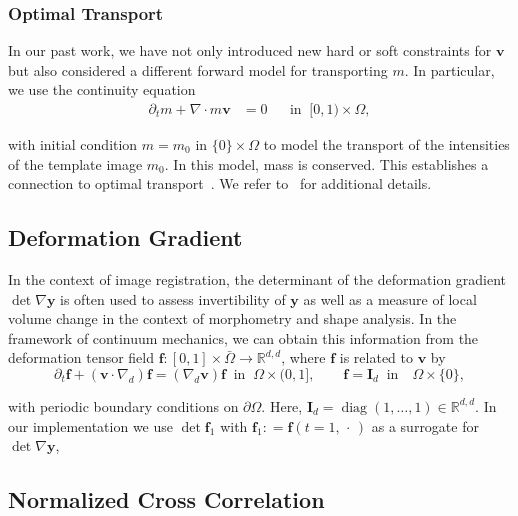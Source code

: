 \documentclass[11pt]{amsart}
\newcommand\igrad{\ensuremath{\nabla}}
\newcommand{\idiv}{\ensuremath{\nabla\cdot}}
\newcommand{\defeq}{\ensuremath{\mathrel{\mathop:}=}}
\renewcommand{\vec}[1]{\ensuremath{\boldsymbol{#1}}}
\begin{document}
\subsubsection*{Optimal Transport}

In our past work, we have not only introduced new hard or soft constraints for $\vec{v}$ but also considered a different forward model for transporting $m$. In particular, we use the continuity equation
\[
\begin{aligned}
\partial_t m + \idiv m \vec{v} & = 0
&& \text{in}\;\; [0,1) \times \Omega,
\end{aligned}
\]

\noindent with initial condition $m = m_0$ in $\{0\} \times \Omega$ to model the transport of the intensities of the template image $m_0$. In this model, mass is conserved. This establishes a connection to optimal transport~\cite{Angenent:2003a,Rehman:2009a,Chen:2018b}. We refer to~\cite{Mang:2017a} for additional details.




\subsection*{Deformation Gradient}

In the context of image registration, the determinant of the deformation gradient $\det \igrad \vec{y}$ is often used to assess invertibility of $\vec{y}$ as well as a measure of local volume change in the context of morphometry and shape analysis. In the framework of continuum mechanics, we can obtain this information from the deformation tensor field $\vec{f} : [0,1] \times \bar{\Omega} \to \mathbb{R}^{d, d}$, where $\vec{f}$ is related to $\vec{v}$ by
\begin{equation}\label{e:def-grad}
\partial_t \vec{f} + (\vec{v} \cdot \igrad_d) \vec{f}
= (\igrad_d \vec{v}) \vec{f} \;\; \text{in} \;\; \Omega \times (0,1],
\qquad \vec{f} = \vec{I}_{d} \;\; \text{in} \quad \Omega \times \{0\},
\end{equation}

\noindent with periodic boundary conditions on $\partial\Omega$. Here, $\vec{I}_d = \operatorname{diag}(1,\ldots,1)\in\mathbb{R}^{d,d}$. In our implementation we use $\det \vec{f}_1$ with $\vec{f}_1 \defeq \vec{f}(t=1,\,\cdot\,)$ as a surrogate for $\det \igrad \vec{y}$,




\subsection*{Normalized Cross Correlation}
\end{document}
